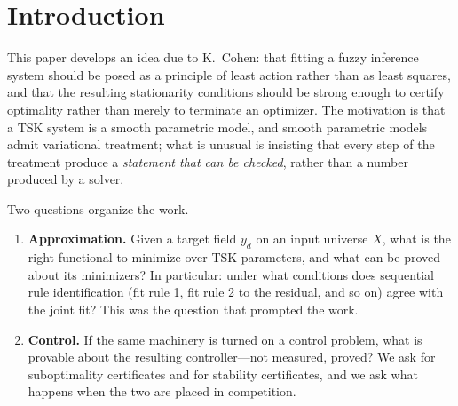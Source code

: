\documentclass[11pt]{article}
\theoremstyle{plain}
\theoremstyle{definition}
\begin{document}
\tableofcontents

\section{Introduction}

This paper develops an idea due to K.\ Cohen: that fitting a fuzzy inference
system should be posed as a principle of least action rather than as least
squares, and that the resulting stationarity conditions should be strong enough
to certify optimality rather than merely to terminate an optimizer. The
motivation is that a TSK system is a smooth parametric model, and smooth
parametric models admit variational treatment; what is unusual is insisting
that every step of the treatment produce a \emph{statement that can be
checked}, rather than a number produced by a solver.

Two questions organize the work.

\begin{enumerate}
\item \textbf{Approximation.} Given a target field $y_d$ on an input universe
$X$, what is the right functional to minimize over TSK parameters, and what can
be proved about its minimizers? In particular: under what conditions does
sequential rule identification (fit rule 1, fit rule 2 to the residual, and so
on) agree with the joint fit? This was the question that prompted the work.

\item \textbf{Control.} If the same machinery is turned on a control problem,
what is provable about the resulting controller---not measured, proved? We ask
for suboptimality certificates and for stability certificates, and we ask what
happens when the two are placed in competition.
\end{enumerate}
\end{document}
